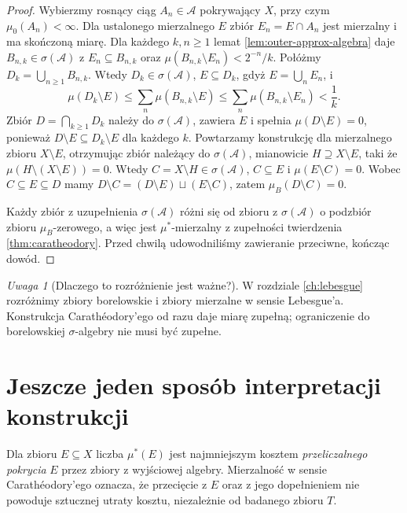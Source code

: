 \documentclass[11pt,a4paper,oneside]{book}
\numberwithin{equation}{chapter}
\theoremstyle{plain}
\theoremstyle{definition}
\theoremstyle{remark}
\newtheorem{uwaga}[twierdzenie]{Uwaga}
\begin{document}
\begin{proof}
Wybierzmy rosnący ciąg $A_n\in\mathcal A$ pokrywający $X$,
przy czym $\mu_0(A_n)<\infty$. Dla ustalonego mierzalnego
$E$ zbiór $E_n=E\cap A_n$ jest mierzalny i ma skończoną miarę.
Dla każdego $k,n\ge1$ lemat \ref{lem:outer-approx-algebra}
daje $B_{n,k}\in\sigma(\mathcal A)$ z
$E_n\subseteq B_{n,k}$ oraz
$\mu(B_{n,k}\setminus E_n)<2^{-n}/k$.
Połóżmy $D_k=\bigcup_{n\ge1}B_{n,k}$.
Wtedy $D_k\in\sigma(\mathcal A)$,
$E\subseteq D_k$, gdyż $E=\bigcup_nE_n$, i
\[
\mu(D_k\setminus E)
\le\sum_n\mu(B_{n,k}\setminus E)
\le\sum_n\mu(B_{n,k}\setminus E_n)<\frac1k.
\]
Zbiór $D=\bigcap_{k\ge1}D_k$ należy do
$\sigma(\mathcal A)$, zawiera $E$ i spełnia
$\mu(D\setminus E)=0$, ponieważ
$D\setminus E\subseteq D_k\setminus E$ dla każdego $k$.
Powtarzamy konstrukcję dla mierzalnego zbioru
$X\setminus E$, otrzymując zbiór należący do
$\sigma(\mathcal A)$, mianowicie $H\supseteq X\setminus E$,
taki że $\mu(H\setminus(X\setminus E))=0$.
Wtedy $C=X\setminus H\in\sigma(\mathcal A)$,
$C\subseteq E$ i $\mu(E\setminus C)=0$.
Wobec $C\subseteq E\subseteq D$ mamy
$D\setminus C=(D\setminus E)\sqcup(E\setminus C)$,
zatem $\mu_B(D\setminus C)=0$.

Każdy zbiór z uzupełnienia $\sigma(\mathcal A)$ różni
się od zbioru z $\sigma(\mathcal A)$ o podzbiór
zbioru $\mu_B$-zerowego, a więc jest
$\mu^*$-mierzalny z zupełności twierdzenia
\ref{thm:caratheodory}. Przed chwilą udowodniliśmy
zawieranie przeciwne, kończąc dowód.
\end{proof}

\begin{uwaga}[Dlaczego to rozróżnienie jest ważne?]
W rozdziale \ref{ch:lebesgue} rozróżnimy zbiory borelowskie
i zbiory mierzalne w sensie Lebesgue'a. Konstrukcja
Carathéodory'ego od razu daje miarę zupełną; ograniczenie
do borelowskiej $\sigma$-algebry nie musi być zupełne.
\end{uwaga}

\section{Jeszcze jeden sposób interpretacji konstrukcji}

Dla zbioru $E\subseteq X$ liczba $\mu^*(E)$ jest
najmniejszym kosztem \emph{przeliczalnego pokrycia} $E$
przez zbiory z wyjściowej algebry. Mierzalność w sensie
Carathéodory'ego oznacza, że przecięcie z $E$ oraz z jego
dopełnieniem nie powoduje sztucznej utraty kosztu,
niezależnie od badanego zbioru $T$.
\end{document}
